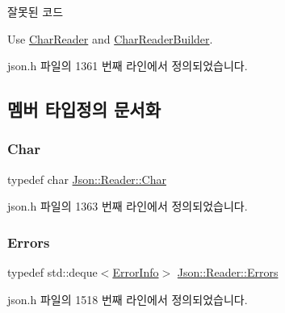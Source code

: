 \begin{DoxyRefDesc}{잘못된 코드}
\item[\hyperlink{deprecated__deprecated000005}{잘못된 코드}]Use \hyperlink{class_json_1_1_char_reader}{Char\+Reader} and \hyperlink{class_json_1_1_char_reader_builder}{Char\+Reader\+Builder}. \end{DoxyRefDesc}


json.\+h 파일의 1361 번째 라인에서 정의되었습니다.



\subsection{멤버 타입정의 문서화}
\mbox{\label{class_json_1_1_reader_a3eec9118f3e9a672ba8348c3a79d0f45}} 
\subsubsection{\texorpdfstring{Char}{Char}}
{\footnotesize\ttfamily typedef char \hyperlink{class_json_1_1_reader_a3eec9118f3e9a672ba8348c3a79d0f45}{Json\+::\+Reader\+::\+Char}}



json.\+h 파일의 1363 번째 라인에서 정의되었습니다.

\mbox{\label{class_json_1_1_reader_aae51e8f5bab3f067261c842a3ef858e5}} 
\subsubsection{\texorpdfstring{Errors}{Errors}}
{\footnotesize\ttfamily typedef std\+::deque$<$\hyperlink{class_json_1_1_reader_1_1_error_info}{Error\+Info}$>$ \hyperlink{class_json_1_1_reader_aae51e8f5bab3f067261c842a3ef858e5}{Json\+::\+Reader\+::\+Errors}\hspace{0.3cm}{\ttfamily [private]}}



json.\+h 파일의 1518 번째 라인에서 정의되었습니다.

\mbox{\label{class_json_1_1_reader_a46795b5b272bf79a7730e406cb96375a}} 
